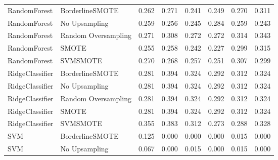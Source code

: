 \begin{tabular}{llllllll}
                RandomForest &     BorderlineSMOTE & 0.262 &                     0.271 &                 0.241 &                  0.249 &                                   0.270 &     0.311 \\
                RandomForest &       No Upsampling & 0.259 &                     0.256 &                 0.245 &                  0.284 &                                   0.259 &     0.243 \\
                RandomForest & Random Oversampling & 0.271 &                     0.308 &                 0.272 &                  0.272 &                                   0.314 &     0.343 \\
                RandomForest &               SMOTE & 0.255 &                     0.258 &                 0.242 &                  0.227 &                                   0.299 &     0.315 \\
                RandomForest &            SVMSMOTE & 0.270 &                     0.268 &                 0.257 &                  0.251 &                                   0.307 &     0.299 \\
             RidgeClassifier &     BorderlineSMOTE & 0.281 &                     0.394 &                 0.324 &                  0.292 &                                   0.312 &     0.324 \\
             RidgeClassifier &       No Upsampling & 0.281 &                     0.394 &                 0.324 &                  0.292 &                                   0.312 &     0.324 \\
             RidgeClassifier & Random Oversampling & 0.281 &                     0.394 &                 0.324 &                  0.292 &                                   0.312 &     0.324 \\
             RidgeClassifier &               SMOTE & 0.281 &                     0.394 &                 0.324 &                  0.292 &                                   0.312 &     0.324 \\
             RidgeClassifier &            SVMSMOTE & 0.355 &                     0.383 &                 0.312 &                  0.273 &                                   0.288 &     0.328 \\
                         SVM &     BorderlineSMOTE & 0.125 &                     0.000 &                 0.000 &                  0.000 &                                   0.015 &     0.000 \\
                         SVM &       No Upsampling & 0.067 &                     0.000 &                 0.015 &                  0.000 &                                   0.015 &     0.000 \\

\end{tabular}
